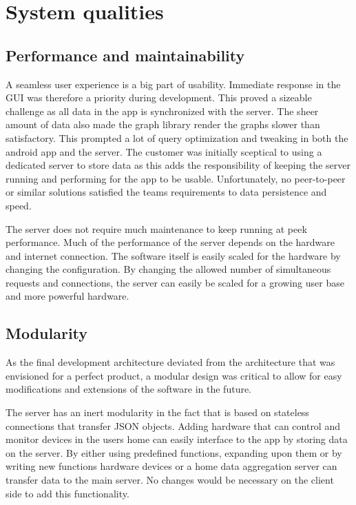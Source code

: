 \section{System qualities}
\subsection{Performance and maintainability}
A seamless user experience is a big part of usability. Immediate response in the GUI was therefore a priority during development. This proved a sizeable challenge as all data in the 
app is synchronized with the server. The sheer amount of data also made the graph library render the graphs slower than satisfactory. This prompted a lot of query optimization and tweaking 
in both the android app and the server. The customer was initially sceptical to using a dedicated server to store data as this adds the responsibility of keeping the server running and performing 
for the app to be usable. Unfortunately, no peer-to-peer or similar solutions satisfied the teams requirements to data persistence and speed.

The server does not require much maintenance to keep running at peek performance. Much of the performance of the server depends on the hardware and internet connection. 
The software itself is easily scaled for the hardware by changing the configuration. By changing the allowed number of simultaneous requests and connections, the server can easily be 
scaled for a growing user base and more powerful hardware.

\subsection{Modularity}
\label{sec:modularity}
As the final development architecture deviated from the architecture that was envisioned for a perfect product, a modular design was critical to allow for easy modifications and 
extensions of the software in the future. 

The server has an inert  modularity in the fact that is based on stateless connections that transfer JSON objects. Adding hardware that can control and monitor devices in the users 
home can easily interface to the app by storing data on the server. By either using predefined functions, expanding upon them or by writing new functions hardware devices or a home data aggregation server can transfer data to the main server. No changes would be necessary on the client side to add this functionality. 

